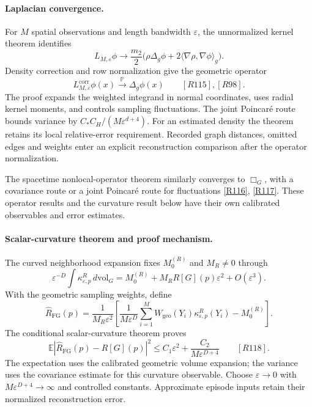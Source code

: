 \documentclass[11pt,a4paper]{article}
\begin{document}
\paragraph{Laplacian convergence.}
For $M$ spatial observations and length bandwidth $\varepsilon$, the
unnormalized kernel theorem identifies
\[
L_{M,\varepsilon}\phi\longrightarrow
\frac{m_2}{2}\bigl(\rho\Delta_g\phi
 +2\langle\nabla\rho,\nabla\phi\rangle_g\bigr).
\]
Density correction and row normalization give the geometric operator
\[
L^{\mathrm{corr}}_{M,\varepsilon}\phi(x)
\xrightarrow{\mathbb P}\Delta_g\phi(x)
\qquad \hyperref[src:thm-laplacian-convergence]{[R115]},
\hyperref[src:prop-density-corrected-limit]{[R98]}.
\]
The proof expands the weighted integrand in normal coordinates, uses radial
kernel moments, and controls sampling fluctuations. The joint Poincar\'e
route bounds variance by $C_*C_H/(M\varepsilon^{d+4})$. For an estimated
density the theorem retains its local relative-error requirement. Recorded
graph distances, omitted edges and weights enter an explicit reconstruction
comparison after the operator normalization.

The spacetime nonlocal-operator theorem similarly converges to $\Box_G$,
with a covariance route or a joint Poincar\'e route for fluctuations
\hyperref[src:thm-cst-fractal-dalembertian-consistency]{[R116]},
\hyperref[src:lem-cst-poincare-variance]{[R117]}. These operator results and the curvature
result below have their own calibrated observables and error estimates.

\paragraph{Scalar-curvature theorem and proof mechanism.}
The curved neighborhood expansion fixes $M_0^{(R)}$ and $M_R\ne0$ through
\[
\varepsilon^{-D}\int\kappa^R_{\varepsilon,p}\,d\mathrm{vol}_G
 =M_0^{(R)}+M_RR[G](p)\varepsilon^2+O(\varepsilon^3).
\]
With the geometric sampling weights, define
\[
\widehat R_{\mathrm{FG}}(p)=\frac1{M_R\varepsilon^2}
\left[\frac1{M\varepsilon^D}\sum_{i=1}^M
 W_{\mathrm{geo}}(Y_i)\kappa^R_{\varepsilon,p}(Y_i)-M_0^{(R)}\right].
\]
The conditional scalar-curvature theorem proves
\[
\mathbb E|\widehat R_{\mathrm{FG}}(p)-R[G](p)|^2
\le C_1\varepsilon^2+\frac{C_2}{M\varepsilon^{D+4}}
\qquad \hyperref[src:thm-fractal-gas-ricci]{[R118]}.
\]
The expectation uses the calibrated geometric volume expansion; the variance
uses the covariance estimate for this curvature observable. Choose
$\varepsilon\to0$ with $M\varepsilon^{D+4}\to\infty$ and controlled constants.
Approximate episode inputs retain their normalized reconstruction error.
\end{document}
